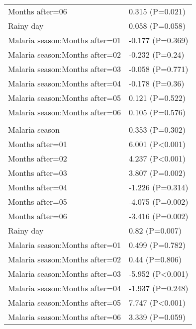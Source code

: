 \documentclass[]{article}
\begin{document}
\begin{longtable}[t]{ll}
\hspace{1em}Months after=06 & 0.315 (P=0.021)\\
\hspace{1em}Rainy day & 0.058 (P=0.058)\\
\hspace{1em}Malaria season:Months after=01 & -0.177 (P=0.369)\\
\hspace{1em}Malaria season:Months after=02 & -0.232 (P=0.24)\\
\hspace{1em}Malaria season:Months after=03 & -0.058 (P=0.771)\\
\hspace{1em}Malaria season:Months after=04 & -0.178 (P=0.36)\\
\hspace{1em}Malaria season:Months after=05 & 0.121 (P=0.522)\\
\hspace{1em}Malaria season:Months after=06 & 0.105 (P=0.576)\\
\addlinespace[1.5em]
\multicolumn{2}{l}{\textbf{Temporary not field worker}}\\
\hspace{1em}Malaria season & 0.353 (P=0.302)\\
\hspace{1em}Months after=01 & 6.001 (P<0.001)\\
\hspace{1em}Months after=02 & 4.237 (P<0.001)\\
\hspace{1em}Months after=03 & 3.807 (P=0.002)\\
\hspace{1em}Months after=04 & -1.226 (P=0.314)\\
\hspace{1em}Months after=05 & -4.075 (P=0.002)\\
\hspace{1em}Months after=06 & -3.416 (P=0.002)\\
\hspace{1em}Rainy day & 0.82 (P=0.007)\\
\hspace{1em}Malaria season:Months after=01 & 0.499 (P=0.782)\\
\hspace{1em}Malaria season:Months after=02 & 0.44 (P=0.806)\\
\hspace{1em}Malaria season:Months after=03 & -5.952 (P<0.001)\\
\hspace{1em}Malaria season:Months after=04 & -1.937 (P=0.248)\\
\hspace{1em}Malaria season:Months after=05 & 7.747 (P<0.001)\\
\hspace{1em}Malaria season:Months after=06 & 3.339 (P=0.059)\\*
\end{longtable}
\end{document}
